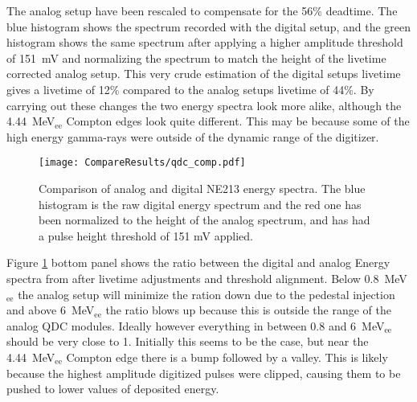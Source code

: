 \documentclass[main.tex]{subfiles}
\begin{document}
The analog setup have been rescaled to compensate for the 56\% deadtime. The blue histogram shows the spectrum recorded with the digital setup, and the green histogram shows the same spectrum after applying a higher amplitude threshold of \SI{151}{mV} and normalizing the spectrum to match the height of the livetime corrected analog setup. This very crude estimation of the digital setups livetime gives a livetime of 12\% compared to the analog setups livetime of 44\%. By carrying out these changes the two energy spectra look more alike, although the \SI{4.44}{\MeV}$_\text{ee}$ Compton edges look quite different. This may be because some of the high energy gamma-rays were outside of the dynamic range of the digitizer.

\begin{figure}[h]
    \centering
        \texttt{[image: CompareResults/qdc\_comp.pdf]}
        \caption[Comparison of analog and digital NE213 energy spectra]{Comparison of analog and digital NE213 energy spectra. The blue histogram is the raw digital energy spectrum and the red one has been normalized to the height of the analog spectrum, and has had a pulse height threshold of 151 mV applied.}
    \label{fig:qdc_comp}
\end{figure}

Figure \ref{fig:qdc_comp} bottom panel shows the ratio between the digital and analog Energy spectra from after livetime adjustments and threshold alignment. Below \SI{0.8}{\MeV}$_\text{ee}$ the analog setup will minimize the ration down due to the pedestal injection and above \SI{6}{\MeV}$_\text{ee}$ the ratio blows up because this is outside the range of the analog QDC modules. Ideally however everything in between 0.8 and \SI{6}{\MeV}$_\text{ee}$ should be very close to 1. Initially this seems to be the case, but near the \SI{4.44}{\MeV}$_\text{ee}$ Compton edge there is a bump followed by a valley. This is likely because the highest amplitude digitized pulses were clipped, causing them to be pushed to lower values of deposited energy.
\end{document}
